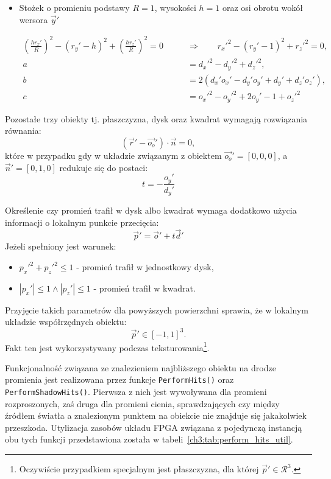 \begin{enumerate}
\begin{itemize}
\item Stożek o promieniu podstawy $R=1$, wysokości $h = 1$ oraz osi obrotu wokół wersora $\vec{y}'$

\begin{align*}
\left(\frac{hr_x'}{R} \right)^2 - (r_y' - h)^2 + \left(\frac{hr_z'}{R} \right)^2 = 0\qquad &\Rightarrow\qquad r_x'^2 - (r_y' - 1)^2 + r_z'^2 = 0,\\
a &= d_x'^2 - d_y'^2 + d_z'^2,\\
b &= 2\left(d_x'o_x' - d_y'o_y' + d_y' + d_z'o_z'\right),\\
c &= o_x'^2 - o_y'^2 + 2o_y' - 1 + o_z'^2
\end{align*}

\end{itemize}

Pozostałe trzy obiekty tj. płaszczyzna, dysk oraz kwadrat wymagają rozwiązania równania:
\begin{equation*}
(\vec{r}' - \vec{o_o}') \cdot \vec{n} = 0,
\end{equation*}
które w przypadku gdy w układzie związanym z obiektem $\vec{o_o}' = [0,0,0]$, a $\vec{n}' = [0, 1, 0]$ redukuje się do postaci:
\begin{equation*}
t = -\frac{o_y'}{d_y'}
\end{equation*}

Określenie czy promień trafił w dysk albo kwadrat wymaga dodatkowo użycia informacji o lokalnym punkcie przecięcia:
\begin{equation}
\vec{p}' = \vec{o}' + t\vec{d}'
\end{equation}
Jeżeli spełniony jest warunek:
\begin{itemize}
\item $p_x'^2 + p_z'^2 \leq 1$ - promień trafił w jednostkowy dysk,
\item $|p_x'| \leq 1 \wedge |p_z'| \leq 1$ - promień trafił w kwadrat.
\end{itemize}
Przyjęcie takich parametrów dla powyższych powierzchni sprawia, że w lokalnym układzie współrzędnych obiektu:
\begin{equation*}
\vec{p}'\in [-1, 1]^3.
\end{equation*}
Fakt ten jest wykorzystywany podczas teksturowania\footnote{Oczywiście przypadkiem specjalnym jest płaszczyzna, dla której $\vec{p}'\in \mathcal{R}^3$.}.

Funkcjonalność związana ze znalezieniem najbliższego obiektu na drodze promienia jest realizowana przez funkcje \texttt{PerformHits()} oraz \texttt{PerformShadowHits()}. Pierwsza z nich jest wywoływana dla promieni rozproszonych, zaś druga dla promieni cienia, sprawdzających czy między źródłem światła a znalezionym punktem na obiekcie nie znajduje się jakakolwiek przeszkoda. Utylizacja zasobów układu FPGA związana z pojedynczą instancją obu tych funkcji przedstawiona została w tabeli~\ref{ch3:tab:perform_hits_util}.


\end{enumerate}
